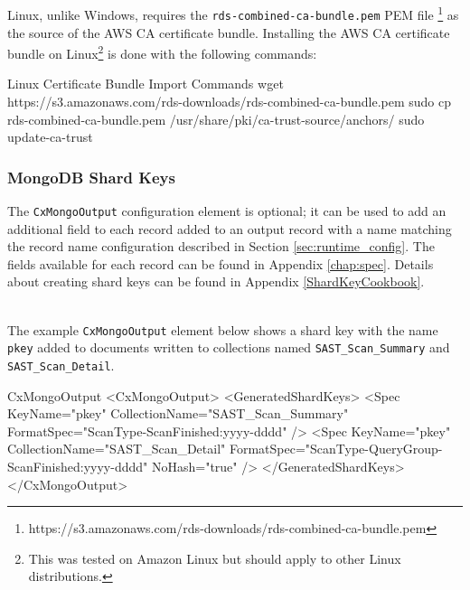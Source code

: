 \noindent\\\\Linux, unlike Windows, requires the 
\texttt{rds-combined-ca-bundle.pem} PEM file
\footnote{https://s3.amazonaws.com/rds-downloads/rds-combined-ca-bundle.pem}
as the source of the AWS CA certificate bundle.  Installing the AWS CA 
certificate bundle on Linux\footnote{This was tested
on Amazon Linux but should apply to other Linux distributions.} is done
with the following commands:\\

\begin{code}{Linux Certificate Bundle Import Commands}{}{}
wget https://s3.amazonaws.com/rds-downloads/rds-combined-ca-bundle.pem
sudo cp rds-combined-ca-bundle.pem /usr/share/pki/ca-trust-source/anchors/
sudo update-ca-trust
\end{code}
   

\subsubsection{MongoDB Shard Keys}

The \texttt{CxMongoOutput} configuration element is optional; it can be used to add an additional field to each record
added to an output record with a name matching the record name configuration described in Section \ref{sec:runtime_config}.  The fields
available for each record can be found in Appendix \ref{chap:spec}. Details about creating shard keys can be found in Appendix \ref{ShardKeyCookbook}.

\noindent\\The example \texttt{CxMongoOutput} element below shows a shard key with the name \texttt{pkey} added to documents
written to collections named \texttt{SAST\_Scan\_Summary} and \texttt{SAST\_Scan\_Detail}.

\begin{xml}{CxMongoOutput}{\contentvariables}{}
<CxMongoOutput>
    <GeneratedShardKeys>
        <Spec 
            KeyName="pkey" 
            CollectionName="SAST_Scan_Summary" 
            FormatSpec="{ScanType}-{ScanFinished:yyyy-dddd}"
            />
        <Spec 
            KeyName="pkey" 
            CollectionName="SAST_Scan_Detail" 
            FormatSpec="{ScanType}-{QueryGroup}-{ScanFinished:yyyy-dddd}" 
            NoHash="true" 
            />
    </GeneratedShardKeys>
</CxMongoOutput>
\end{xml}
    


